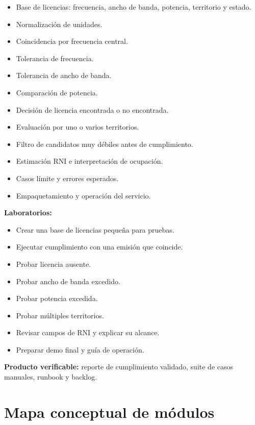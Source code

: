 \documentclass[11pt,a4paper]{article}
\newcommand{\producto}{\textbf{Producto verificable:} }
\begin{document}
\begin{itemize}
  \item Base de licencias: frecuencia, ancho de banda, potencia, territorio y estado.
  \item Normalización de unidades.
  \item Coincidencia por frecuencia central.
  \item Tolerancia de frecuencia.
  \item Tolerancia de ancho de banda.
  \item Comparación de potencia.
  \item Decisión de licencia encontrada o no encontrada.
  \item Evaluación por uno o varios territorios.
  \item Filtro de candidatos muy débiles antes de cumplimiento.
  \item Estimación RNI e interpretación de ocupación.
  \item Casos límite y errores esperados.
  \item Empaquetamiento y operación del servicio.
\end{itemize}

\textbf{Laboratorios:}

\begin{itemize}
  \item Crear una base de licencias pequeña para pruebas.
  \item Ejecutar cumplimiento con una emisión que coincide.
  \item Probar licencia ausente.
  \item Probar ancho de banda excedido.
  \item Probar potencia excedida.
  \item Probar múltiples territorios.
  \item Revisar campos de RNI y explicar su alcance.
  \item Preparar demo final y guía de operación.
\end{itemize}

\producto reporte de cumplimiento validado, suite de casos manuales, runbook y backlog.

\section*{Mapa conceptual de módulos}
\end{document}
